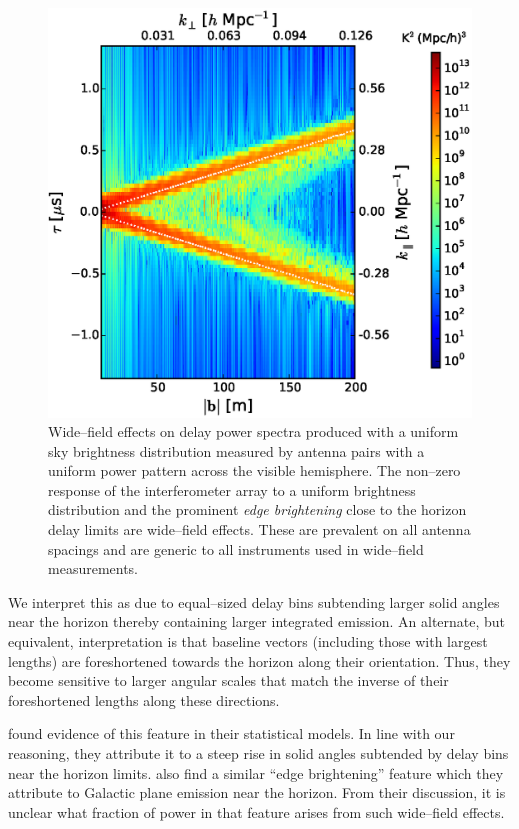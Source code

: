 \documentclass[preprint2,iop,numberedappendix]{emulateapj}
\begin{document}
\begin{figure}[htb]
\centering
\includegraphics[width=\linewidth]{figure3.eps}
\caption{Wide--field effects on delay power spectra produced with a uniform sky brightness distribution measured by antenna pairs with a uniform power pattern across the visible hemisphere. The non--zero response of the interferometer array to a uniform brightness distribution and the prominent {\it edge brightening} close to the horizon delay limits are wide--field effects. These are prevalent on all antenna spacings and are generic to all instruments used in wide--field measurements. \label{fig:usm}}
\end{figure}

We interpret this as due to equal--sized delay bins subtending larger solid angles near the horizon thereby containing larger integrated emission. An alternate, but equivalent, interpretation is that baseline vectors (including those with largest lengths) are foreshortened towards the horizon along their orientation. Thus, they become sensitive to larger angular scales that match the inverse of their foreshortened lengths along these directions.

\citet{thy13} found evidence of this feature in their statistical models. In line with our reasoning, they attribute it to a steep rise in solid angles subtended by delay bins near the horizon limits. \citet{pob13} also find a similar ``edge brightening'' feature which they attribute to Galactic plane emission near the horizon. From their discussion, it is unclear what fraction of power in that feature arises from such wide--field effects.
\end{document}
